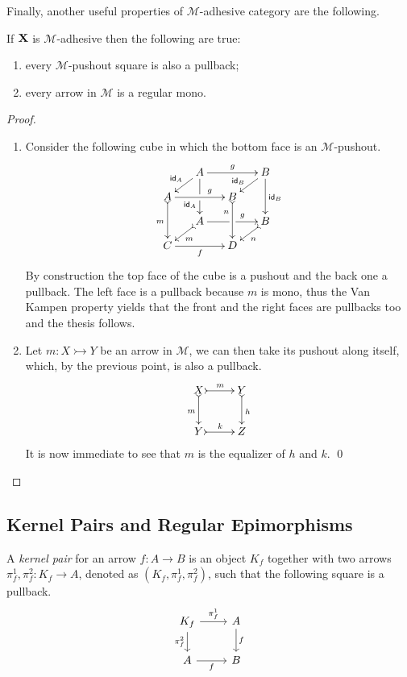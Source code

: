 \documentclass[runningheads,envcountsect]{llncs}
\def\C{\textbf {\textup{C}}}
\def\X{\textbf {\textup{X}}}
\newcommand{\mto}{\rightarrowtail}
\newcommand{\id}[1]{\mathsf{id}_{#1}}
\begin{document}
Finally, another  useful properties of $\mathcal{M}$-adhesive category are the following.
\begin{proposition}\label{prop:regmono}
	If $\X$ is $\mathcal{M}$-adhesive then the following are true:
	\begin{enumerate}
		\item every $\mathcal{M}$-pushout square is also a pullback;
		\item every arrow in $\mathcal{M}$ is a regular mono.
	\end{enumerate}
\end{proposition}
\begin{proof}
	\begin{enumerate}
		\item  Consider the following cube in which the bottom face is an $\mathcal{M}$-pushout.
		\[\xymatrix@C=15pt@R=9pt{&A\ar[dd]|\hole_(.65){\id{A}}\ar[rr]^{g} \ar[dl]_{\id{A}} && B \ar[dd]^{\id{B}} \ar[dl]_(.6){\id{B}} \\ A  \ar@{>->}[dd]_{m}\ar[rr]^(.65){g} & & B \ar@{>->}[dd]_(.3){n}\\&A\ar[rr]|\hole^(.65){g} \ar@{>->}[dl]^{m} && B \ar@{>->}[dl]^{n} \\C \ar[rr]_{f} & & D}\]
		By construction the top face of the cube is a pushout and the back one a pullback. The left face is a pullback because $m$ is mono, thus the Van Kampen property yields that the front and the right faces are pullbacks too and the thesis follows.
		\item Let $m\colon X\mto Y$ be an arrow in $\mathcal{M}$, we can then take its pushout along itself, which, by the previous point, is also a pullback.
		\[\xymatrix{X \ar@{>->}[r]^{m} \ar@{>->}[d]_{m}& Y \ar@{>->}[d]^{h}\\ Y \ar@{>->}[r]^{k} & Z}\]
		It is now immediate to see that $m$ is the equalizer of $h$ and $k$. \qed
	\end{enumerate}
\end{proof}

\subsection{Kernel Pairs and Regular Epimorphisms}

\begin{definition}
    A \emph{kernel pair} for an arrow $f: A \to B$ is an object $K_f$ together with two arrows $\pi^1_f, \pi^2_f : K_f \to A$, denoted as $(K_f, \pi^1_f, \pi^2_f)$, such that the following square is a pullback.
    \[
        \begin{tikzcd}
            K_f \ar[r, "{\pi^1_f}"] \ar[d, "{\pi^2_f}" swap] & A \arrow[d, "f"] \\
            A \ar[r, "f"swap] & B
        \end{tikzcd}
    \]
\end{definition}
\end{document}
